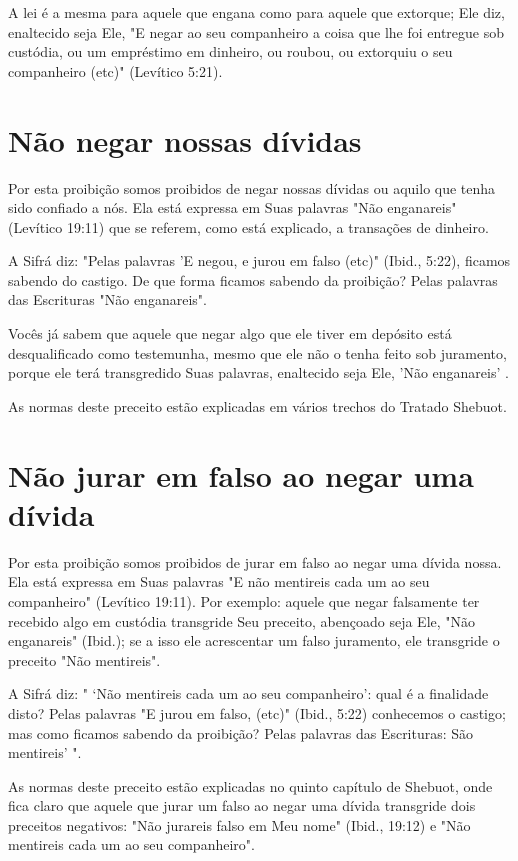 \begin{itemize}
\begin{enumrate}
\begin{itemize}
\begin{itemize}
\begin{itemize}
A lei é a mesma para aquele que engana como para aquele que extor­que;
Ele diz, enaltecido seja Ele, "E negar ao seu companheiro a coisa que
lhe foi entregue sob custódia, ou um empréstimo em dinheiro, ou roubou,
ou ex­torquiu o seu companheiro (etc)" (Levítico 5:21).

\section{Não negar nossas dívidas}

Por esta proibição somos proibidos de negar nossas dívidas ou aqui­lo
que tenha sido confiado a nós. Ela está expressa em Suas palavras "Não
en­ganareis" (Levítico 19:11) que se referem, como está explicado, a
transações de dinheiro.

A Sifrá diz: "Pelas palavras 'E negou, e jurou em falso (etc)" (Ibid.,
5:22), ficamos sabendo do castigo. De que forma ficamos sabendo da
proibi­ção? Pelas palavras das Escrituras "Não enganareis".

Vocês já sabem que aquele que negar algo que ele tiver em depósito está
desqualificado como testemunha, mesmo que ele não o tenha feito sob
juramento, porque ele terá transgredido Suas palavras, enaltecido seja
Ele, 'Não enganareis' .

As normas deste preceito estão explicadas em vários trechos do Tra­tado
Shebuot.

\section{Não jurar em falso ao negar uma dívida}

Por esta proibição somos proibidos de jurar em falso ao negar uma dívida
nossa. Ela está expressa em Suas palavras "E não mentireis cada um ao
seu companheiro" (Levítico 19:11). Por exemplo: aquele que negar
falsamente ter recebido algo em custódia transgride Seu preceito,
abençoado seja Ele, "Não enganareis" (Ibid.); se a isso ele acrescentar
um falso juramento, ele transgride o preceito "Não mentireis".

A Sifrá diz: " `Não mentireis cada um ao seu companheiro': qual é a
finalidade disto? Pelas palavras "E jurou em falso, (etc)" (Ibid., 5:22)
conhe­cemos o castigo; mas como ficamos sabendo da proibição? Pelas
palavras das Escrituras: São mentireis' ".

As normas deste preceito estão explicadas no quinto capítulo de
She­buot, onde fica claro que aquele que jurar um falso ao negar uma
dívida trans­gride dois preceitos negativos: "Não jurareis falso em Meu
nome" (Ibid., 19:12) e "Não mentireis cada um ao seu companheiro".


\end{itemize}
\end{itemize}
\end{itemize}
\end{enumrate}
\end{itemize}
